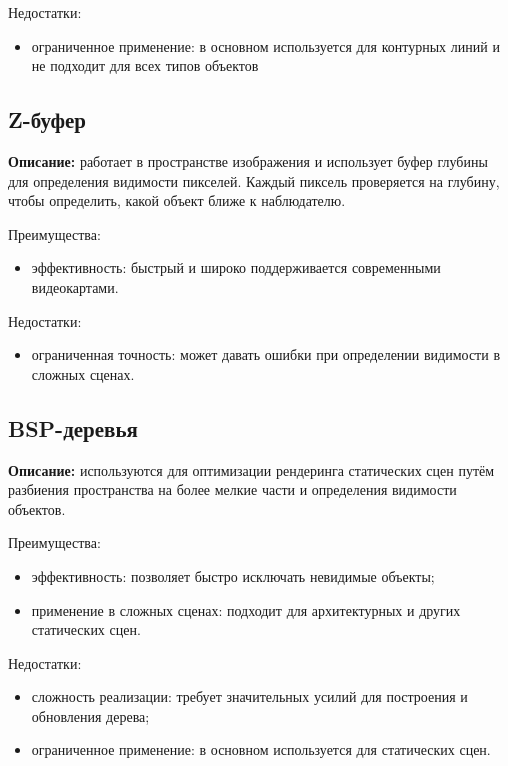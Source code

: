 Недостатки:
\begin{itemize}
\item ограниченное применение: в основном используется для контурных линий и не подходит для всех типов объектов
\end{itemize}

\subsection{Z-буфер}

\textbf{Описание:} работает в пространстве изображения и использует буфер глубины для определения видимости пикселей. Каждый пиксель проверяется на глубину, чтобы определить, какой объект ближе к наблюдателю.~\cite{lit3, lit4}

Преимущества:
\begin{itemize}
\item эффективность: быстрый и широко поддерживается современными видеокартами.
\end{itemize}

Недостатки:
\begin{itemize}
\item ограниченная точность: может давать ошибки при определении видимости в сложных сценах.
\end{itemize}

\subsection{BSP-деревья}

\textbf{Описание:} используются для оптимизации рендеринга статических сцен путём разбиения пространства на более мелкие части и определения видимости объектов.~\cite{lit3}

Преимущества:
\begin{itemize}
\item эффективность: позволяет быстро исключать невидимые объекты;
\item применение в сложных сценах: подходит для архитектурных и других статических сцен.
\end{itemize}

Недостатки:
\begin{itemize}
\item сложность реализации: требует значительных усилий для построения и обновления дерева;
\item ограниченное применение: в основном используется для статических сцен.
\end{itemize}

